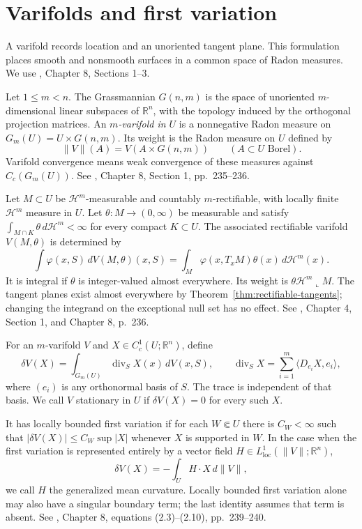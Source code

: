 \chapter{Varifolds and first variation}\label{sec:varifolds}
A varifold records location and an unoriented tangent plane. This formulation places smooth and nonsmooth surfaces in a common space of Radon measures. We use \cite{Sim18}, Chapter 8, Sections 1--3.

\begin{definition}\label{def:varifold}
Let $1\leq m<n$. The Grassmannian $G(n,m)$ is the space of unoriented $m$-dimensional linear subspaces of $\mathbb{R}^n$, with the topology induced by the orthogonal projection matrices. An \emph{$m$-varifold in $U$} is a nonnegative Radon measure on $G_m(U)=U\times G(n,m)$. Its weight is the Radon measure on $U$ defined by
\[
 \|V\|(A)=V(A\times G(n,m))\qquad(A\subset U\text{ Borel}).
\]
Varifold convergence means weak convergence of these measures against $C_c(G_m(U))$. See \cite{Sim18}, Chapter 8, Section 1, pp.~235--236.
\end{definition}

\begin{definition}\label{def:rectifiable-varifold}
Let $M\subset U$ be $\mathcal{H}^m$-measurable and countably $m$-rectifiable, with locally finite $\mathcal{H}^m$ measure in $U$. Let $\theta:M\to(0,\infty)$ be measurable and satisfy $\int_{M\cap K}\theta\,d\mathcal{H}^m<\infty$ for every compact $K\subset U$. The associated rectifiable varifold $V(M,\theta)$ is determined by
\[
 \int\varphi(x,S)\,dV(M,\theta)(x,S)
 =\int_M\varphi(x,T_xM)\theta(x)\,d\mathcal{H}^m(x).
\]
It is integral if $\theta$ is integer-valued almost everywhere. Its weight is $\theta\mathcal{H}^m\llcorner M$. The tangent planes exist almost everywhere by Theorem~\ref{thm:rectifiable-tangents}; changing the integrand on the exceptional null set has no effect. See \cite{Sim18}, Chapter 4, Section 1, and Chapter 8, p.~236.
\end{definition}

\begin{definition}\label{def:first-variation}
For an $m$-varifold $V$ and $X\in C_c^1(U;\mathbb{R}^n)$, define
\[
 \delta V(X)=\int_{G_m(U)}\operatorname{div}_S X(x)\,dV(x,S),\qquad
 \operatorname{div}_S X=\sum_{i=1}^m\langle D_{e_i}X,e_i\rangle,
\]
where $(e_i)$ is any orthonormal basis of $S$. The trace is independent of that basis. We call $V$ stationary in $U$ if $\delta V(X)=0$ for every such $X$.

It has locally bounded first variation if for each $W\Subset U$ there is $C_W<\infty$ such that $|\delta V(X)|\leq C_W\sup|X|$ whenever $X$ is supported in $W$. In the case when the first variation is represented entirely by a vector field $H\in L^1_{\mathrm{loc}}(\|V\|;\mathbb{R}^n)$,
\[
 \delta V(X)=-\int_U H\cdot X\,d\|V\|,
\]
we call $H$ the generalized mean curvature. Locally bounded first variation alone may also have a singular boundary term; the last identity assumes that term is absent. See \cite{Sim18}, Chapter 8, equations (2.3)--(2.10), pp.~239--240.
\end{definition}

